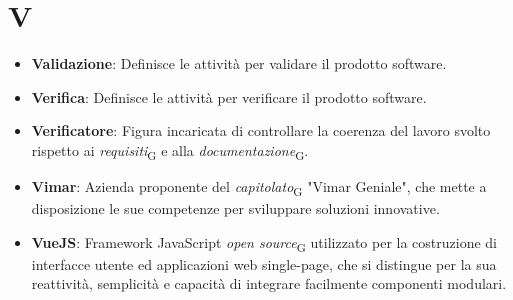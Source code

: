\section{V}
\begin{itemize}
    \item \textbf{Validazione}: Definisce le attività per validare il prodotto software.
    \item \textbf{Verifica}: Definisce le attività per verificare il prodotto software.
    \item \textbf{Verificatore}: Figura incaricata di controllare la coerenza del lavoro svolto rispetto ai \textit{requisiti}\textsubscript{G} e alla \textit{documentazione}\textsubscript{G}.
    \item \textbf{Vimar}: Azienda proponente del \textit{capitolato}\textsubscript{G} "Vimar Geniale", che mette a disposizione le sue competenze per sviluppare soluzioni innovative.
    \item \textbf{VueJS}: Framework JavaScript \textit{open source}\textsubscript{G} utilizzato per la costruzione di interfacce utente ed applicazioni web single-page, che si distingue per la sua reattività, semplicità e capacità di integrare facilmente componenti modulari.
\end{itemize}
